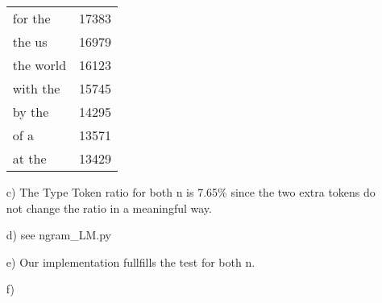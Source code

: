 \documentclass{article}
\begin{document}
\begin{itemize}
\begin{table}[h]
\begin{tabular}{l|c}
		for the & 17383 \\
		the us & 16979 \\
		the world & 16123 \\
		with the & 15745 \\
		by the & 14295 \\
		of a & 13571 \\
		at the & 13429  \\
		\end{tabular}
	\end{table}
	\item[c)]
	The Type Token ratio for both n is 7.65\% since the two extra tokens do not change the ratio in a meaningful way.
 	\item[d)] see ngram\_LM.py
 	\item[e)] Our implementation fullfills the test for both n.
 	\item[f)] 
\end{itemize}
\end{document}
